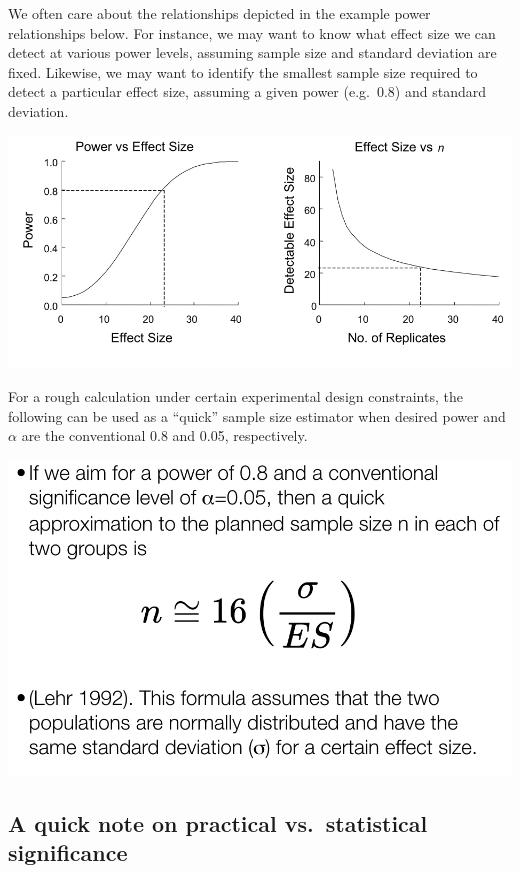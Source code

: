 \documentclass[]{book}
\begin{document}
We often care about the relationships depicted in the example power relationships below. For instance, we may want to know what effect size we can detect at various power levels, assuming sample size and standard deviation are fixed. Likewise, we may want to identify the smallest sample size required to detect a particular effect size, assuming a given power (e.g.~0.8) and standard deviation.

\begin{center}\includegraphics[width=0.9\linewidth]{images/images_6b.002} \end{center}

For a rough calculation under certain experimental design constraints, the following can be used as a ``quick'' sample size estimator when desired power and \(\alpha\) are the conventional 0.8 and 0.05, respectively.

\begin{center}\includegraphics[width=13.11in]{images/images_6b.003} \end{center}

\hypertarget{a-quick-note-on-practical-vs.statistical-significance}{%
\subsection{A quick note on practical vs.~statistical significance}\label{a-quick-note-on-practical-vs.statistical-significance}}
\end{document}
